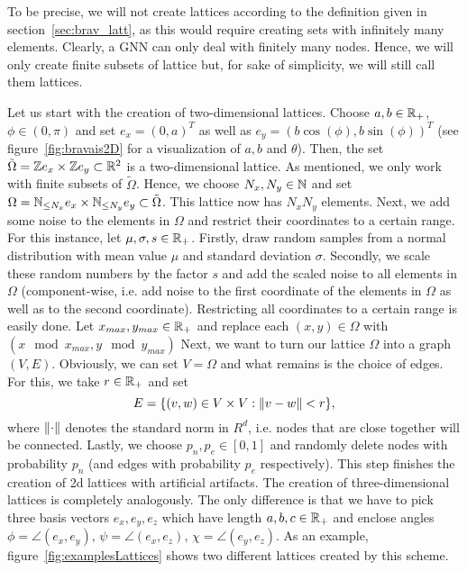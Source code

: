 \label{sec:creationLattice}

To be precise, we will not create lattices according to the definition given in section~\ref{sec:brav_latt}, 
as this would require creating sets with infinitely many elements. Clearly, a GNN can only deal with finitely many nodes.
Hence, we will only create finite subsets of lattice but, for sake of simplicity, we will still call them lattices.

Let us start with the creation of two-dimensional lattices.
Choose $a,b\in\mathbb{R}_+$, $\phi\in(0,\pi)$ and set
$e_x=(0,a)^T$ as well as $e_y=(b\cos(\phi), b\sin(\phi))^T$ (see figure~\ref{fig:bravais2D} for a visualization of $a,b$ and $\theta$). 
Then, the set $\tilde{\Omega}=\mathbb{Z} e_x\times\mathbb{Z} e_y\subset\mathbb{R}^2$ is a two-dimensional lattice.
As mentioned, we only work with finite subsets of $\tilde{\Omega}$. Hence, we choose $N_x,N_y\in\mathbb{N}$ and set $\Omega=\mathbb{N}_{\leq N_x}e_x\times\mathbb{N}_{\leq N_y}e_y\subset\tilde{\Omega}$.
This lattice now has $N_xN_y$ elements.
Next, we add some noise to the elements in $\Omega$ and restrict their coordinates to a certain range. For this instance, let $\mu,\sigma,s\in\mathbb{R}_+$. Firstly, draw random samples from
a normal distribution with mean value $\mu$ and standard deviation $\sigma$. Secondly, we scale these random numbers by the factor $s$ 
and add the scaled noise to all elements in $\Omega$ (component-wise, i.e. add noise to the first coordinate of the elements in $\Omega$ as well as to the second coordinate).
Restricting all coordinates to a certain range is easily done. Let $x_{max}, y_{max}\in\mathbb{R}_+$ and replace each $(x,y)\in\Omega$ with $(x \mod x_{max}, y \mod y_{max})$ 
Next, we want to turn our lattice $\Omega$ into a graph $(V,E)$. Obviously, we can set $V=\Omega$ and what remains is the choice of edges. For this, we take $r\in\mathbb{R}_+$ and set
\begin{equation*}
    E=\{(v, w)\in V\times V: \lVert v-w\rVert<r\},
\end{equation*}
where $\lVert\cdot\rVert$ denotes the standard norm in $R^d$, i.e. nodes that are close together will be connected.
Lastly, we choose $p_n,p_e\in[0,1]$ and randomly delete nodes with probability $p_n$ (and edges with probability $p_e$ respectively).
This step finishes the creation of 2d lattices with artificial artifacts.
The creation of three-dimensional lattices is completely analogously. The only difference is that we have to pick three basis vectors $e_x,e_y,e_z$ which have length $a,b,c\in\mathbb{R}_+$ and 
enclose angles $\phi=\angle(e_x, e_y),\,\psi=\angle(e_x,e_z),\,\chi=\angle(e_y,e_z)$. 
As an example, figure~\ref{fig:examplesLattices} shows two different lattices created by this scheme.

